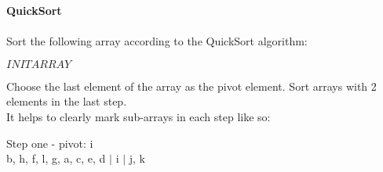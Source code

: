 \textbf{\LARGE{\color{tumgadPurple}QuickSort}}\\
\\
\noindent
Sort the following array according to the QuickSort algorithm:
\begin{center}
    $INITARRAY$
\end{center}
Choose the last element of the array as the pivot element. Sort arrays with 2 elements in the last step.\\
It helps to clearly mark sub-arrays in each step like so:
\noindent
\begin{center}
    Step one - pivot: i\\
    b, h, f, l, g, a, c, e, d $|$ i $|$ j, k\\
    \vspace{10px}
\end{center}
\noindent{}

